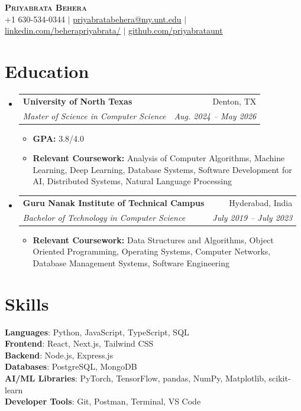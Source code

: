 \documentclass[letterpaper,10pt]{article}
\makeatletter
\newcommand{\resumeItem}[1]{
  \item\small{
    {#1 \vspace{-2pt}}
  }
}
\newcommand{\resumeSubheading}[4]{
  \vspace{-2pt}\item
    \begin{tabular*}{0.97\textwidth}[t]{l@{\extracolsep{\fill}}r}
      \textbf{#1} & #2 \\
      \textit{\small#3} & \textit{\small #4} \\
    \end{tabular*}\vspace{-7pt}
}
\newcommand{\resumeSubHeadingListStart}{\begin{itemize}[leftmargin=0.15in, label={}]}
\newcommand{\resumeSubHeadingListEnd}{\end{itemize}}
\newcommand{\resumeItemListStart}{\begin{itemize}}
\newcommand{\resumeItemListEnd}{\end{itemize}\vspace{-5pt}}
\makeatother
\begin{document}
\begin{center}
    \textbf{\Huge \scshape Priyabrata Behera} \\ \vspace{1pt}
    \small +1 630-534-0344 $|$ \href{mailto:priyabratabehera@my.unt.edu}{\underline{priyabratabehera@my.unt.edu}} $|$ 
    \href{https://www.linkedin.com/in/beherapriyabrata/}{\underline{linkedin.com/beherapriyabrata/}} $|$
    \href{https://github.com/priyabrataunt}{\underline{github.com/priyabrataunt}}
\end{center}

\section{Education}
  \resumeSubHeadingListStart
    \resumeSubheading
      {University of North Texas}{Denton, TX}
      {Master of Science in Computer Science}{Aug. 2024 -- May 2026}
      \resumeItemListStart
        \resumeItem{\textbf{GPA:} 3.8/4.0}
        \resumeItem{\textbf{Relevant Coursework:} Analysis of Computer Algorithms, Machine Learning, Deep Learning, Database Systems, Software Development for AI, Distributed Systems, Natural Language Processing}
      \resumeItemListEnd
    \resumeSubheading
  {Guru Nanak Institute of Technical Campus}{Hyderabad, India}
  {Bachelor of Technology in Computer Science}{July 2019 -- July 2023}
  \resumeItemListStart
    \resumeItem{\textbf{Relevant Coursework:} Data Structures and Algorithms, Object Oriented Programming, Operating Systems, Computer Networks, Database Management Systems, Software Engineering}
  \resumeItemListEnd
  \resumeSubHeadingListEnd

\section{Skills}
 \begin{itemize}[leftmargin=0.15in, label={}]
    \small{\item{
     \textbf{Languages}{: Python, JavaScript, TypeScript, SQL} \\
     \textbf{Frontend}{: React, Next.js, Tailwind CSS} \\
     \textbf{Backend}{: Node.js, Express.js} \\
     \textbf{Databases}{: PostgreSQL, MongoDB} \\
     \textbf{AI/ML Libraries}{: PyTorch, TensorFlow, pandas, NumPy, Matplotlib, scikit-learn} \\
     \textbf{Developer Tools}{: Git, Postman, Terminal, VS Code}
    }}
 \end{itemize}
\end{document}
